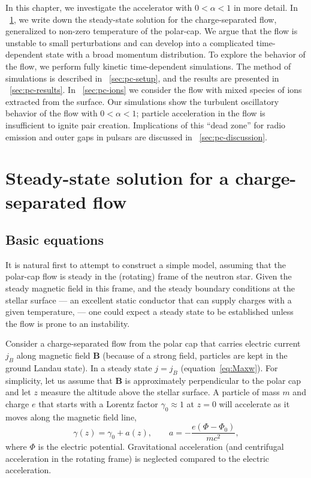 In this chapter, we investigate the accelerator with $0<\alpha<1$ in more
detail. In \Sect~\ref{sec:pc-steady-state}, we write down the steady-state
solution for the charge-separated flow, generalized to non-zero temperature of
the polar-cap. We argue that the flow is unstable to small perturbations and can
develop into a complicated time-dependent state with a broad momentum
distribution. To explore the behavior of the flow, we perform fully kinetic
time-dependent simulations. The method of simulations is described in
\Sect~\ref{sec:pc-setup}, and the results are presented in
\Sect~\ref{sec:pc-results}. In \Sect~\ref{sec:pc-ions} we consider the flow with
mixed species of ions extracted from the surface. Our simulations show the
turbulent oscillatory behavior of the flow with $0<\alpha<1$; particle
acceleration in the flow is insufficient to ignite pair creation. Implications
of this ``dead zone'' for radio emission and outer gaps in pulsars are discussed
in \Sect~\ref{sec:pc-discussion}.


\section{Steady-state solution for a charge-separated flow}
\label{sec:pc-steady-state}


\subsection{Basic equations}


It is natural first to attempt to construct a simple model,
assuming that the polar-cap flow is steady in the (rotating) frame of the neutron star.
Given the steady magnetic field in this frame,
and the steady boundary conditions at the stellar surface --- an excellent
static conductor that can supply charges with a given temperature, --- one
could expect a steady state to be established unless the flow is prone to an instability.

Consider a charge-separated flow from the polar cap that carries electric current
$j_B$ along magnetic field $\mathbf{B}$ (because of a strong field, particles are kept in
the ground Landau state).
In a steady state $j=j_B$ (equation~\ref{eq:Maxw}).
For simplicity, let us assume that $\mathbf{B}$ is approximately perpendicular to
the polar cap and let $z$ measure the altitude above the stellar surface.
A particle of mass $m$ and charge $e$ that starts with a Lorentz factor
$\gamma_0\approx 1$ at $z=0$ will accelerate as it moves along the magnetic
field line,
\begin{equation}
\label{eq:a}
    \gamma(z)=\gamma_0+a(z),  \qquad a=-\frac{e(\Phi-\Phi_0)}{mc^2},
\end{equation}
where $\Phi$ is the electric potential.
Gravitational acceleration (and centrifugal acceleration in the rotating frame) is
neglected compared to the electric acceleration.

